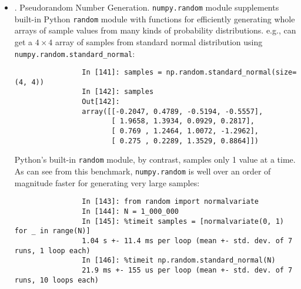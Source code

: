 \documentclass{article}
\begin{document}
\begin{enumerate}
\begin{itemize}
\begin{itemize}
\begin{itemize}
\begin{verbatim}
					In [17]: np.dot(arr.T, arr)
					Out[17]: 
					array([[39, 20, 12],
					       [20, 14,  2],
					       [12,  2, 10]])
				\end{verbatim}
				\verb|@infix| operator is another way to do matrix multiplication:
				\begin{verbatim}
					In [138]: arr.T @ arr
					Out[138]:
					array([[39, 20, 12],
					       [20, 14, 2],
					       [12, 2, 10]])
				\end{verbatim}
				Simple transposing with {\tt.T} is a special case of swapping axes. ndarray has method {\tt swapaxes}, which takes a pair of axis numbers \& switches indicated axes to rearrange data:
				\begin{verbatim}
					In [139]: arr
					Out[139]:
					array([[ 0, 1, 0],
					       [ 1, 2, -2],
					       [ 6, 3, 2],
					       [-1, 0, -1],
					       [ 1, 0, 1]])
					In [140]: arr.swapaxes(0, 1)
					Out[140]:
					array([[ 0, 1, 6, -1, 1],
					       [ 1, 2, 3, 0, 0],
					       [ 0, -2, 2, -1, 1]])
				\end{verbatim}
				{\tt swapaxes} similarly returns a view on data without making a copy.
			\end{itemize}
			\item {. Pseudorandom Number Generation.} {\tt numpy.random} module supplements built-in Python {\tt random} module with functions for efficiently generating whole arrays of sample values from many kinds of probability distributions. e.g., can get a $4\times4$ array of samples from standard normal distribution using \verb|numpy.random.standard_normal|:
			\begin{verbatim}
				In [141]: samples = np.random.standard_normal(size=(4, 4))
				In [142]: samples
				Out[142]:
				array([[-0.2047, 0.4789, -0.5194, -0.5557],
				       [ 1.9658, 1.3934, 0.0929, 0.2817],
				       [ 0.769 , 1.2464, 1.0072, -1.2962],
				       [ 0.275 , 0.2289, 1.3529, 0.8864]])
			\end{verbatim}
			Python's built-in {\tt random} module, by contrast, samples only 1 value at a time. As can see from this benchmark, {\tt numpy.random} is well over an order of magnitude faster for generating very large samples:
			\begin{verbatim}
				In [143]: from random import normalvariate
				In [144]: N = 1_000_000
				In [145]: %timeit samples = [normalvariate(0, 1) for _ in range(N)]
				1.04 s +- 11.4 ms per loop (mean +- std. dev. of 7 runs, 1 loop each)
				In [146]: %timeit np.random.standard_normal(N)
				21.9 ms +- 155 us per loop (mean +- std. dev. of 7 runs, 10 loops each)

\end{verbatim}
\end{itemize}
\end{itemize}
\end{enumerate}
\end{document}

